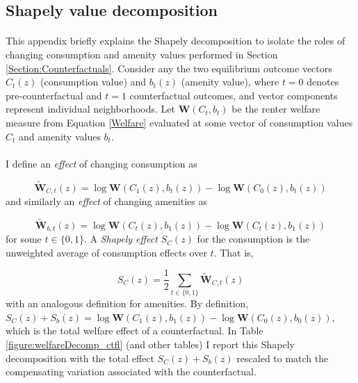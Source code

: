 \documentclass[12pt]{article}
\begin{document}
	\clearpage
	
	\subsection{Shapely value decomposition}\label{Appendix:ShapeDecompDefn}
		\paragraph*{}
		This appendix briefly explains the Shapely decomposition to isolate the roles of changing consumption and amenity values performed in Section \ref{Section:Counterfactuals}. Consider any the two equilibrium outcome vectors $C_{t}(z)$ (consumption value) and $b_{t}(z)$ (amenity value), where $t = 0$ denotes pre-counterfactual and $t = 1$ counterfactual outcomes, and vector components represent individual neighborhoods. Let $\boldsymbol{W}(C_{t}, b_{t})$ be the renter welfare measure from Equation \eqref{Welfare} evaluated at some vector of consumption values $C_{t}$ and amenity values $b_{t}$. 
		
		\paragraph*{}
		I define an \textit{effect} of changing consumption as
		
		\begin{equation}
			\tilde{\boldsymbol{W}}_{C, t}(z) = \log \boldsymbol{W}(C_{1}(z), b_{t}(z)) - \log \boldsymbol{W}(C_{0}(z), b_{t}(z))
		\end{equation}
		and similarly an \textit{effect} of changing amenities as 
		
		\begin{equation*}
			\tilde{\boldsymbol{W}}_{b, t}(z) = \log \boldsymbol{W}(C_{t}(z), b_{1}(z)) - \log \boldsymbol{W}(C_{t}(z), b_{1}(z))
		\end{equation*}
		for some $t \in \{0, 1\}$. A \textit{Shapely effect} $S_{C}(z)$ for the consumption is the unweighted average of consumption effects over $t$. That is, 
		
		\begin{equation}
			S_{C}(z) = \frac{1}{2}\sum_{t \in \{0, 1\}}	\tilde{\boldsymbol{W}}_{C, t}(z)
		\end{equation}
		with an analogous definition for amenities. By definition, 	$S_{C}(z) + S_{b}(z) = \log \boldsymbol{W}(C_{1}(z), b_{1}(z)) - \log \boldsymbol{W}(C_{0}(z), b_{0}(z))$, which is the total welfare effect of a counterfactual. In Table \ref{figure:welfareDecomp_ctfl} (and other tables) I report this Shapely decomposition with the total effect $S_{C}(z) + S_{b}(z)$ rescaled to match the compensating variation associated with the counterfactual. 
		
\end{document}
